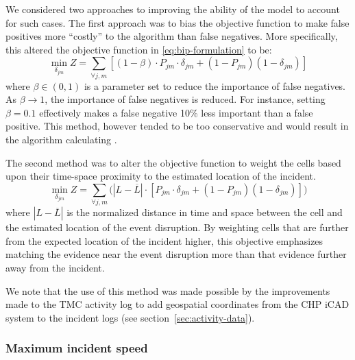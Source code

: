 \documentclass[12pt]{report}
\newcounter{time}
\newcounter{space}
\begin{document}
We considered two approaches to improving the ability of the model to
account for such cases.  The first approach was to bias the objective
function to make false positives more ``costly'' to the algorithm than
false negatives.  More specifically, this altered the objective
function in \eqref{eq:bip-formulation} to be:
\begin{equation}
  \label{eq:false-positive-bias}
  \min\limits_{\delta_{jm}} Z = \sum\limits_{\forall{}j,m}\left[(1-\beta)\cdot{}P_{jm}\cdot{}\delta_{jm}+(1-P_{jm})(1-\delta_{jm})\right]
\end{equation}
where $\beta \in (0,1)$ is a parameter set to reduce the importance of
false negatives.  As $\beta \rightarrow 1$, the importance of false
negatives is reduced.  For instance, setting $\beta = 0.1$ effectively
makes a false negative 10\% less important than a false positive.
%
This method, however tended to be too conservative and would result in
the algorithm calculating .

The second method was to alter the objective function to weight the
cells based upon their time-space proximity to the estimated location
of the incident.
\begin{equation}
    \label{eq:distance-weighting}
    \min\limits_{\delta_{jm}} Z = \sum\limits_{\forall{}j,m}\bigg(\left|L - \overline{L}\right|\cdot{}\left[P_{jm}\cdot{}\delta_{jm}+(1-P_{jm})(1-\delta_{jm})\right]\bigg)
\end{equation}
where $\left|L - \overline{L}\right|$ is the normalized distance in
time and space between the cell and the estimated location of the
event disruption.  By weighting cells that are further from the
expected location of the incident higher, this objective emphasizes
matching the evidence near the event disruption more than that
evidence further away from the incident.  


We note that the use of this method was made possible by the
improvements made to the \ac{TMC} activity log to add geospatial
coordinates from the \ac{CHP} \ac{iCAD} system to the incident logs
(see section~\ref{sec:activity-data}).


\subsubsection{Maximum incident speed}
\label{sec:max-inc-spd}
\end{document}
